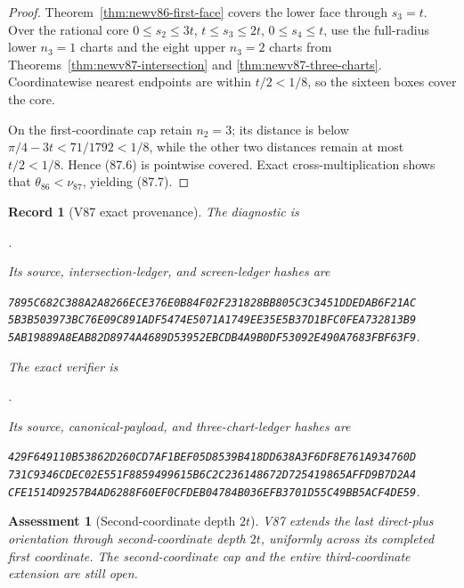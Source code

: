 \documentclass[11pt,oneside]{article}
\newtheorem{assessment}[theorem]{Assessment}
\newtheorem{record}[theorem]{Record}
\theoremstyle{definition}
\theoremstyle{remark}
\begin{document}
\begin{proof}
Theorem~\ref{thm:newv86-first-face} covers the lower face through
\(s_3=t\).  Over the rational core \(0\leq s_2\leq3t\),
\(t\leq s_3\leq2t\), \(0\leq s_4\leq t\), use the full-radius
lower \(n_3=1\) charts and the eight upper \(n_3=2\) charts from
Theorems~\ref{thm:newv87-intersection} and
\ref{thm:newv87-three-charts}.  Coordinatewise nearest endpoints
are within \(t/2<1/8\), so the sixteen boxes cover the core.

On the first-coordinate cap retain \(n_2=3\); its distance is below
\(\pi/4-3t<71/1792<1/8\), while the other two distances remain at
most \(t/2<1/8\).  Hence (87.6) is pointwise covered.  Exact
cross-multiplication shows that \(\theta_{86}<\nu_{87}\), yielding
(87.7).
\end{proof}

\begin{record}[V87 exact provenance]
\label{rec:newv87-provenance}
The diagnostic is
\begin{center}\footnotesize
{}.
\end{center}
Its source, intersection-ledger, and screen-ledger hashes are
\begin{center}\scriptsize
\texttt{7895C682C388A2A8266ECE376E0B84F02F231828BB805C3C3451DDEDAB6F21AC}\\
\texttt{5B3B503973BC76E09C891ADF5474E5071A1749EE35E5B37D1BFC0FEA732813B9}\\
\texttt{5AB19889A8EAB82D8974A4689D53952EBCDB4A9B0DF53092E490A7683FBF63F9}.
\end{center}
The exact verifier is
\begin{center}\footnotesize
{}.
\end{center}
Its source, canonical-payload, and three-chart-ledger hashes are
\begin{center}\scriptsize
\texttt{429F649110B53862D260CD7AF1BEF05D8539B418DD638A3F6DF8E761A934760D}\\
\texttt{731C9346CDEC02E551F8859499615B6C2C236148672D725419865AFFD9B7D2A4}\\
\texttt{CFE1514D9257B4AD6288F60EF0CFDEB04784B036EFB3701D55C49BB5ACF4DE59}.
\end{center}
\end{record}

\begin{assessment}[Second-coordinate depth \(2t\)]
\label{ass:newv87}
V87 extends the last direct-plus orientation through second-coordinate
depth \(2t\), uniformly across its completed first coordinate.  The
second-coordinate cap and the entire third-coordinate extension are
still open.
\end{assessment}
\end{document}
